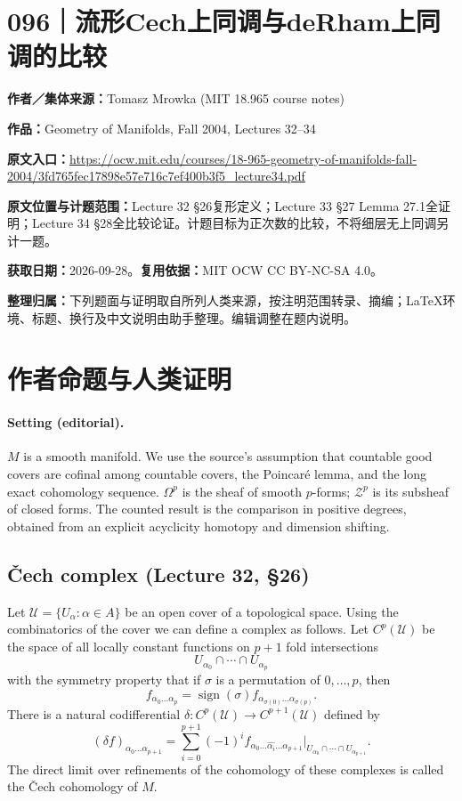 \documentclass[UTF8,11pt,a4paper]{ctexart}
\theoremstyle{definition}\newtheorem*{definition}{Definition}
\theoremstyle{remark}\newtheorem*{remark}{Remark}
\begin{document}
\section*{096｜流形Cech上同调与deRham上同调的比较}
\textbf{作者／集体来源：}Tomasz Mrowka (MIT 18.965 course notes)

\textbf{作品：}Geometry of Manifolds, Fall 2004, Lectures 32--34

\textbf{原文入口：}\url{https://ocw.mit.edu/courses/18-965-geometry-of-manifolds-fall-2004/3fd765fec17898e57e716c7ef400b3f5_lecture34.pdf}

\textbf{原文位置与计题范围：}Lecture 32 §26复形定义；Lecture 33 §27 Lemma 27.1全证明；Lecture 34 §28全比较论证。计题目标为正次数的比较，不将细层无上同调另计一题。

\textbf{获取日期：}2026-09-28。\quad\textbf{复用依据：}MIT OCW CC BY-NC-SA 4.0。

\textbf{整理归属：}下列题面与证明取自所列人类来源，按注明范围转录、摘编；LaTeX环境、标题、换行及中文说明由助手整理。编辑调整在题内说明。

\section*{作者命题与人类证明}

\paragraph{Setting (editorial).}
$M$ is a smooth manifold. We use the source's assumption that countable good covers are cofinal among countable covers, the Poincar\'e lemma, and the long exact cohomology sequence. $\Omega^p$ is the sheaf of smooth $p$-forms; $\mathcal Z^p$ is its subsheaf of closed forms. The counted result is the comparison in positive degrees, obtained from an explicit acyclicity homotopy and dimension shifting.

\subsection*{\v Cech complex (Lecture 32, \S26)}
Let $\mathcal U=\{U_\alpha:\alpha\in A\}$ be an open cover of a topological space. Using the combinatorics of the cover we can define a complex as follows. Let $C^p(\mathcal U)$ be the space of all locally constant functions on $p+1$ fold intersections
\[
U_{\alpha_0}\cap\cdots\cap U_{\alpha_p}
\]
with the symmetry property that if $\sigma$ is a permutation of $0,\ldots,p$, then
\[
f_{\alpha_0\ldots\alpha_p}=\operatorname{sign}(\sigma)f_{\alpha_{\sigma(0)}\ldots\alpha_{\sigma(p)}}.
\]
There is a natural codifferential $\delta:C^p(\mathcal U)\to C^{p+1}(\mathcal U)$ defined by
\[
(\delta f)_{\alpha_0\ldots\alpha_{p+1}}
=\sum_{i=0}^{p+1}(-1)^i
 f_{\alpha_0\ldots\widehat{\alpha_i}\ldots\alpha_{p+1}}
 \big|_{U_{\alpha_0}\cap\cdots\cap U_{\alpha_{p+1}}}.
\]
The direct limit over refinements of the cohomology of these complexes is called the \v Cech cohomology of $M$.
\end{document}
